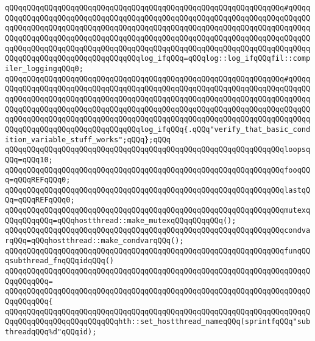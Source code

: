 \verb|qQQqqQQqqQQqqQQqqQQqqQQqqQQqqQQqqQQqqQQqqQQqqQQqqQQqqQQqqQQqqQQq#qQQqqQQqqQQqqQQqqQQqqQQqqQQqqQQqqQQqqQQqqQQqqQQqqQQqqQQqqQQqqQQqqQQqqQQqqQQqqQQqqQQqqQQqqQQqqQQqqQQqqQQqqQQqqQQqqQQqqQQqqQQqqQQqqQQqqQQqqQQqqQQqqQQqqQQqqQQqqQQqqQQqqQQqqQQqqQQqqQQqqQQqqQQqqQQqqQQqqQQqqQQqqQQqqQQqqQQqqQQqqQQqqQQqqQQqqQQqqQQqqQQqqQQqqQQqqQQqqQQqqQQqqQQqqQQqqQQqqQQqqQQqqQQqqQQqqQQqqQQqqQQqqQQqqQQqqQQqlog_ifqQQq=qQQqlog::log_ifqQQqfil::compiler_loggingqQQq0;|\newline
\verb|qQQqqQQqqQQqqQQqqQQqqQQqqQQqqQQqqQQqqQQqqQQqqQQqqQQqqQQqqQQqqQQq#qQQqqQQqqQQqqQQqqQQqqQQqqQQqqQQqqQQqqQQqqQQqqQQqqQQqqQQqqQQqqQQqqQQqqQQqqQQqqQQqqQQqqQQqqQQqqQQqqQQqqQQqqQQqqQQqqQQqqQQqqQQqqQQqqQQqqQQqqQQqqQQqqQQqqQQqqQQqqQQqqQQqqQQqqQQqqQQqqQQqqQQqqQQqqQQqqQQqqQQqqQQqqQQqqQQqqQQqqQQqqQQqqQQqqQQqqQQqqQQqqQQqqQQqqQQqqQQqqQQqqQQqqQQqqQQqqQQqqQQqqQQqqQQqqQQqqQQqqQQqqQQqqQQqqQQqqQQqlog_ifqQQq{.qQQq"verify_that_basic_condition_variable_stuff_works";qQQq};qQQq|\newline
\newline
\verb|qQQqqQQqqQQqqQQqqQQqqQQqqQQqqQQqqQQqqQQqqQQqqQQqqQQqqQQqqQQqqQQqloopsqQQq=qQQq10;|\newline
\newline
\verb|qQQqqQQqqQQqqQQqqQQqqQQqqQQqqQQqqQQqqQQqqQQqqQQqqQQqqQQqqQQqqQQqfooqQQq=qQQqREFqQQq0;|\newline
\verb|qQQqqQQqqQQqqQQqqQQqqQQqqQQqqQQqqQQqqQQqqQQqqQQqqQQqqQQqqQQqqQQqlastqQQq=qQQqREFqQQq0;|\newline
\newline
\verb|qQQqqQQqqQQqqQQqqQQqqQQqqQQqqQQqqQQqqQQqqQQqqQQqqQQqqQQqqQQqqQQqmutexqQQqqQQqqQQq=qQQqhostthread::make_mutexqQQqqQQqqQQq();|\newline
\verb|qQQqqQQqqQQqqQQqqQQqqQQqqQQqqQQqqQQqqQQqqQQqqQQqqQQqqQQqqQQqqQQqcondvarqQQq=qQQqhostthread::make_condvarqQQq();|\newline
\newline
\verb|qQQqqQQqqQQqqQQqqQQqqQQqqQQqqQQqqQQqqQQqqQQqqQQqqQQqqQQqqQQqqQQqfunqQQqsubthread_fnqQQqidqQQq()|\newline
\verb|qQQqqQQqqQQqqQQqqQQqqQQqqQQqqQQqqQQqqQQqqQQqqQQqqQQqqQQqqQQqqQQqqQQqqQQqqQQqqQQq=|\newline
\verb|qQQqqQQqqQQqqQQqqQQqqQQqqQQqqQQqqQQqqQQqqQQqqQQqqQQqqQQqqQQqqQQqqQQqqQQqqQQqqQQq{|\newline
\verb|qQQqqQQqqQQqqQQqqQQqqQQqqQQqqQQqqQQqqQQqqQQqqQQqqQQqqQQqqQQqqQQqqQQqqQQqqQQqqQQqqQQqqQQqqQQqqQQqhth::set_hostthread_nameqQQq(sprintfqQQq"subthreadqQQq%d"qQQqid);|\newline
